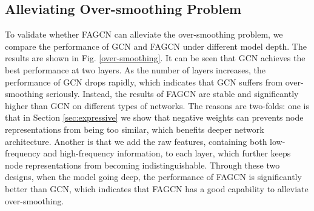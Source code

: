\documentclass[letterpaper]{article} %
\begin{document}


\subsection{Alleviating Over-smoothing Problem}
To validate whether FAGCN can alleviate the over-smoothing problem, we compare the performance of GCN and FAGCN under different model depth. The results are shown in Fig. \ref{over-smoothing}. It can be seen that GCN achieves the best performance at two layers. As the number of layers increases, the performance of GCN drops rapidly, which indicates that GCN suffers from over-smoothing seriously. Instead, the results of FAGCN are stable and significantly higher than GCN on different types of networks. The reasons are two-folds: one is that in Section \ref{sec:expressive} we show that negative weights can prevents node representations from being too similar, which benefits deeper network architecture. Another is that we add the raw features, containing both low-frequency and high-frequency information, to each layer, which further keeps node representations from becoming indistinguishable. Through these two designs, when the model going deep, the performance of FAGCN is significantly better than GCN, which indicates that FAGCN has a good capability to alleviate over-smoothing.
\end{document}
